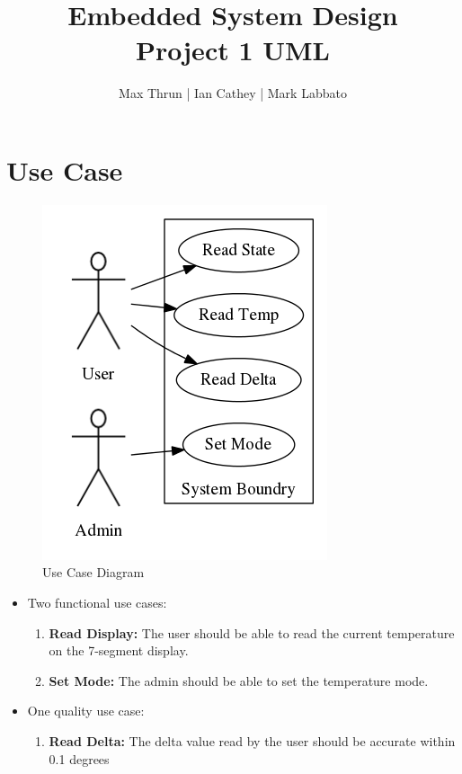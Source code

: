 \documentclass[12pt]{article}
\title{Embedded System Design \\ Project 1 UML}
\author{ Max Thrun | Ian Cathey | Mark Labbato }
\begin{document}
\maketitle


\section*{Use Case}

\begin{figure}[htb]
\centering
\includegraphics[scale=0.8]{use_case.png}
\caption{Use Case Diagram}
\label{fig:awesome_image}
\end{figure}

\begin{itemize}
    \item Two functional use cases:
    \begin{enumerate}
        \item \textbf{Read Display:} The user should be able to read the current temperature on the 7-segment display.
        \item \textbf{Set Mode:} The admin should be able to set the temperature mode. 
    \end{enumerate}
    \item One quality use case:
    \begin{enumerate}
        \item \textbf{Read Delta:} The delta value read by the user should be accurate within 0.1 degrees
    \end{enumerate}
\end{itemize}
\end{document}
